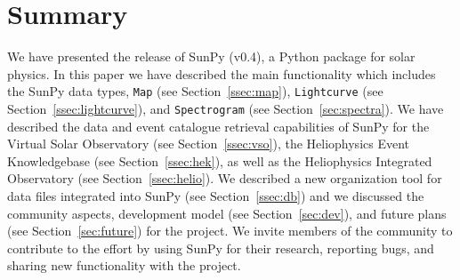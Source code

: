 \section{Summary}
We have presented the release of SunPy (v0.4), a Python package for solar physics. In
this paper we have described the main functionality which includes the SunPy data types, 
\texttt{Map} (see Section~\ref{ssec:map}), \texttt{Lightcurve} (see Section~\ref{ssec:lightcurve}), and \texttt{Spectrogram} (see Section~\ref{sec:spectra}).
We have described the data and event catalogue retrieval capabilities of SunPy for
the Virtual Solar Observatory (see Section~\ref{ssec:vso}), the Heliophysics Event Knowledgebase (see Section~\ref{ssec:hek}), as well as
the Heliophysics Integrated Observatory (see Section~\ref{ssec:helio}). We described
a new organization tool for data files integrated into SunPy (see Section~\ref{ssec:db}) 
and we discussed the community aspects, development model (see Section~\ref{sec:dev}), and future plans (see Section~\ref{sec:future}) for the project.
We invite members of the community to contribute to the effort by using SunPy for their 
research, reporting bugs, and sharing new functionality with the project.